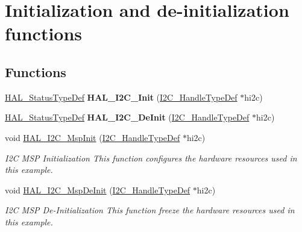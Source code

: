 \hypertarget{group___i2_c___exported___functions___group1}{}\section{Initialization and de-\/initialization functions}
\label{group___i2_c___exported___functions___group1}
\subsection*{Functions}
\begin{DoxyCompactItemize}
\item 
\mbox{\label{group___i2_c___exported___functions___group1_ga9d29159a6da072287fff73743fd93260}} 
\hyperlink{stm32f4xx__hal__def_8h_a63c0679d1cb8b8c684fbb0632743478f}{H\+A\+L\+\_\+\+Status\+Type\+Def} {\bfseries H\+A\+L\+\_\+\+I2\+C\+\_\+\+Init} (\hyperlink{struct_____i2_c___handle_type_def}{I2\+C\+\_\+\+Handle\+Type\+Def} $\ast$hi2c)
\item 
\mbox{\label{group___i2_c___exported___functions___group1_gabda634ba18f874775d1262c887d273b4}} 
\hyperlink{stm32f4xx__hal__def_8h_a63c0679d1cb8b8c684fbb0632743478f}{H\+A\+L\+\_\+\+Status\+Type\+Def} {\bfseries H\+A\+L\+\_\+\+I2\+C\+\_\+\+De\+Init} (\hyperlink{struct_____i2_c___handle_type_def}{I2\+C\+\_\+\+Handle\+Type\+Def} $\ast$hi2c)
\item 
void \hyperlink{group___i2_c___exported___functions___group1_gabe01a202c27b23fc150aa66af3130073}{H\+A\+L\+\_\+\+I2\+C\+\_\+\+Msp\+Init} (\hyperlink{struct_____i2_c___handle_type_def}{I2\+C\+\_\+\+Handle\+Type\+Def} $\ast$hi2c)
\begin{DoxyCompactList}\small\item\em I2C M\+SP Initialization This function configures the hardware resources used in this example. \end{DoxyCompactList}\item 
void \hyperlink{group___i2_c___exported___functions___group1_ga2ec8d9b09854c732e2feed549278f048}{H\+A\+L\+\_\+\+I2\+C\+\_\+\+Msp\+De\+Init} (\hyperlink{struct_____i2_c___handle_type_def}{I2\+C\+\_\+\+Handle\+Type\+Def} $\ast$hi2c)
\begin{DoxyCompactList}\small\item\em I2C M\+SP De-\/\+Initialization This function freeze the hardware resources used in this example. \end{DoxyCompactList}\end{DoxyCompactItemize}


